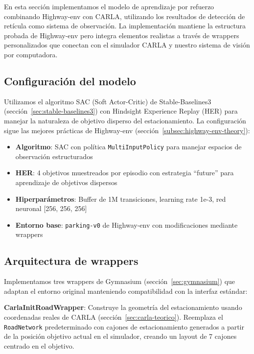 
En esta sección implementamos el modelo de aprendizaje por refuerzo combinando Highway-env con CARLA,
utilizando los resultados de detección de retícula como sistema de observación. La implementación
mantiene la estructura probada de Highway-env pero integra elementos realistas a través de wrappers
personalizados que conectan con el simulador CARLA y nuestro sistema de visión por computadora.

\subsection{Configuración del modelo}

Utilizamos el algoritmo SAC (Soft Actor-Critic) de Stable-Baselines3 (sección~\ref{sec:stable-baselines3})
con Hindsight Experience Replay (HER) para manejar la naturaleza de objetivo disperso del estacionamiento.
La configuración sigue las mejores prácticas de Highway-env (sección~\ref{subsec:highway-env-theory}):

\begin{itemize}
    \item \textbf{Algoritmo}: SAC con política \texttt{MultiInputPolicy} para manejar espacios de observación estructurados
    \item \textbf{HER}: 4 objetivos muestreados por episodio con estrategia ``future'' para aprendizaje de objetivos dispersos
    \item \textbf{Hiperparámetros}: Buffer de 1M transiciones, learning rate 1e-3, red neuronal [256, 256, 256]
    \item \textbf{Entorno base}: \texttt{parking-v0} de Highway-env con modificaciones mediante wrappers
\end{itemize}

\subsection{Arquitectura de wrappers}

Implementamos tres wrappers de Gymnasium (sección~\ref{sec:gymnasium}) que adaptan el entorno original
manteniendo compatibilidad con la interfaz estándar:


\textbf{CarlaInitRoadWrapper}: Construye la geometría del estacionamiento usando coordenadas reales de CARLA
(sección~\ref{sec:carla-teorico}). Reemplaza el \texttt{RoadNetwork} predeterminado con cajones de estacionamiento
generados a partir de la posición objetivo actual en el simulador, creando un layout de 7 cajones centrado
en el objetivo.


